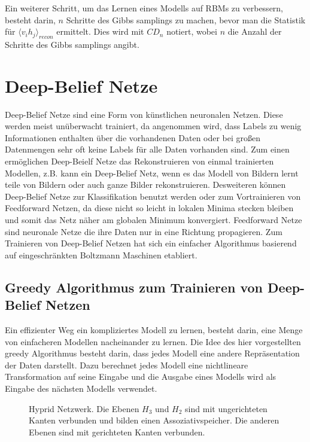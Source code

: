 \documentclass[12pt]{article}
\begin{document}
Ein weiterer Schritt, um das Lernen eines Modells auf RBMs zu verbessern, besteht darin, $n$ Schritte des Gibbs samplings zu machen, bevor man die Statistik für $\langle v_i h_j \rangle_{recon}$ ermittelt. Dies wird mit $CD_n$ notiert, wobei $n$ die Anzahl der Schritte des Gibbs samplings angibt.

\section{Deep-Belief Netze}
Deep-Belief Netze sind eine Form von künstlichen neuronalen Netzen. Diese werden meist unüberwacht trainiert, da angenommen wird, dass Labels zu wenig Informationen enthalten über die vorhandenen Daten oder bei großen Datenmengen sehr oft keine Labels für alle Daten vorhanden sind. Zum einen ermöglichen Deep-Beielf Netze das Rekonstruieren von einmal trainierten Modellen, z.B. kann ein Deep-Belief Netz, wenn es das Modell von Bildern lernt teile von Bildern oder auch ganze Bilder rekonstruieren. Desweiteren können Deep-Belief Netze zur Klassifikation benutzt werden oder zum Vortrainieren von Feedforward Netzen, da diese nicht so leicht in lokalen Minima stecken bleiben und somit das Netz näher am globalen Minimum konvergiert. Feedforward Netze sind neuronale Netze die ihre Daten nur in eine Richtung propagieren. Zum Trainieren von Deep-Belief Netzen hat sich ein einfacher Algorithmus basierend auf eingeschränkten Boltzmann Maschinen etabliert.

\subsection{Greedy Algorithmus zum Trainieren von Deep-Belief Netzen}


Ein effizienter Weg ein kompliziertes Modell zu lernen, besteht darin, eine Menge von einfacheren Modellen nacheinander zu lernen. Die Idee des hier vorgestellten greedy Algorithmus besteht darin, dass jedes Modell eine andere Repräsentation der Daten darstellt. Dazu berechnet jedes Modell eine nichtlineare Transformation auf seine Eingabe und die Ausgabe eines Modells wird als Eingabe des nächsten Modells verwendet. 

\begin{figure}[H]
	\center
	
	\caption{Hyprid Netzwerk. Die Ebenen $H_3$ und $H_2$ sind mit ungerichteten Kanten verbunden und bilden einen Assoziativspeicher. Die anderen Ebenen sind mit gerichteten Kanten verbunden.}
	\label{Netz}
\end{figure}
\end{document}
